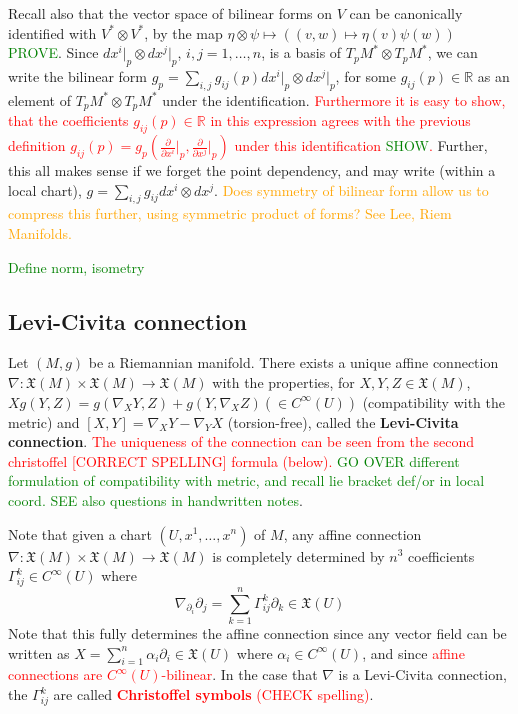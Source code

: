 \documentclass[a4paper]{article}
\theoremstyle{definition} \newtheorem*{definition}{Definition}
\theoremstyle{definition} \newtheorem*{definitions}{Definitions}
\theoremstyle{plain} \newtheorem{theorem}{Theorem}[section]
\theoremstyle{plain} \newtheorem{proposition}[theorem]{Proposition}
\theoremstyle{plain} \newtheorem{corollary}[theorem]{Corollary}
\theoremstyle{plain} \newtheorem{lemma}[theorem]{Lemma}
\theoremstyle{plain} \newtheorem{example}[theorem]{Example}
\newcommand{\checkCorrect}[1]{\textcolor{red}{#1}}
\newcommand{\question}[1]{\textcolor{orange}{#1}}
\newcommand{\finish}[1]{\textcolor{green}{#1}}
\newcommand{\defn}[1]{\textbf{#1}}
\newcommand{\realnos}{\mathbb{R}}
\begin{document}
Recall also that the vector space of bilinear forms on $V$ can be canonically identified with $V^\ast \otimes V^\ast$, by the map $\eta\otimes \psi \mapsto ((v,w)\mapsto \eta(v)\psi(w))$ \finish{PROVE}. Since $dx^i\vert_p\otimes dx^j\vert_p$, $i,j=1,\ldots, n$, is a basis of $T_pM^\ast \otimes T_pM^\ast$, we can write the bilinear form $g_p=\sum_{i,j} g_{ij}(p)dx^i\vert_p \otimes dx^j\vert_p$, for some $g_{ij}(p)\in \realnos$ as an element of $T_pM^\ast \otimes T_pM^\ast$ under the identification. \checkCorrect{Furthermore it is easy to show, that the coefficients $g_{ij}(p)\in \realnos$ in this expression agrees with the previous definition $g_{ij}(p)=g_p(\frac{\partial}{\partial x^i}\vert_p, \frac{\partial}{\partial x^j}\vert_p)$ under this identification \finish{SHOW}.} Further, this all makes sense if we forget the point dependency, and may write (within a local chart), $g=\sum_{i,j}g_{ij} dx^i\otimes dx^j$. \question{Does symmetry of bilinear form allow us to compress this further, using symmetric product of forms? See Lee, Riem Manifolds.}

\finish{Define norm, isometry}

\subsection{Levi-Civita connection}
Let $(M, g)$ be a Riemannian manifold. There exists a unique affine connection $\nabla:\mathfrak{X}(M)\times \mathfrak{X}(M)\to \mathfrak{X}(M)$ with the properties, for $X,Y,Z\in \mathfrak{X}(M)$,
$Xg(Y,Z)=g(\nabla_XY, Z)+g(Y, \nabla_XZ) (\in C^\infty(U))$ (compatibility with the metric) and $[X,Y]=\nabla_XY-\nabla_YX$ (torsion-free), called the \defn{Levi-Civita connection}. \checkCorrect{The uniqueness of the connection can be seen from the second christoffel [CORRECT SPELLING] formula (below).} \finish{GO OVER different formulation of compatibility with metric, and recall lie bracket def/or in local coord. SEE also questions in handwritten notes}.

Note that given a chart $(U, x^1, \ldots, x^n)$ of $M$, any affine connection $\nabla:\mathfrak{X}(M)\times \mathfrak{X}(M)\to \mathfrak{X}(M)$ is completely determined by $n^3$ coefficients $\Gamma^k_{ij}\in C^\infty (U)$ where
$$\nabla_{\partial_i}\partial_j=\sum_{k=1}^n \Gamma^k_{ij} \partial_k \in \mathfrak{X}(U)$$
Note that this fully determines the affine connection since any vector field can be written as $X=\sum_{i=1}^n \alpha_i \partial_i\in \mathfrak{X}(U)$ where $\alpha_i\in C^\infty (U)$, and since \checkCorrect{affine connections are $C^\infty(U)$-bilinear}. In the case that $\nabla$ is a Levi-Civita connection, the $\Gamma^k_{ij}$ are called \checkCorrect{\defn{Christoffel symbols} (CHECK spelling)}.
\end{document}

